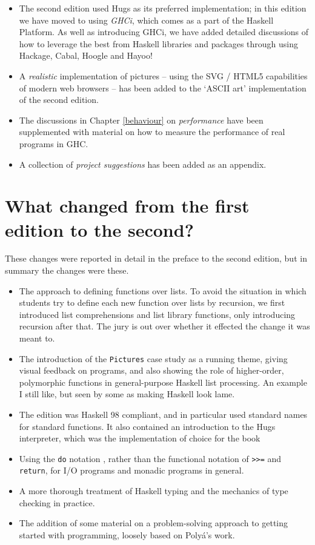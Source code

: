 \begin{itemize}
\item 
The second edition used Hugs as its preferred implementation; in this edition we have moved to using \emph{GHCi}, which comes as a part of the Haskell Platform. As well as introducing GHCi, we have added detailed discussions of how to leverage the best from Haskell libraries and packages through using Hackage, Cabal, Hoogle and Hayoo!

\item
A \emph{realistic} implementation of pictures -- using the SVG / HTML5 capabilities of modern web browsers -- has been added to the `ASCII art' implementation of the second edition. 

\item
The discussions in Chapter \ref{behaviour} on \emph{performance} have been supplemented with material on how to measure the performance of real programs in GHC.

\item
A collection of \emph{project suggestions} has been added as an appendix.
\end{itemize}

\section*{What changed from the first edition to the second?}

These changes were reported in detail in the preface to the second edition, but in summary the changes were these.
\begin{itemize}
\item
The approach to defining functions over lists. To avoid the situation in which students try to define each new function over lists by recursion, we first introduced list comprehensions and list library functions, only introducing recursion after that. The jury is out over whether it effected the change it was meant to.
\item
The introduction of the \texttt{Pictures} case study as a running theme, giving visual feedback on programs, and also showing the role of higher-order, polymorphic functions in general-purpose Haskell list processing. An example I still like, but seen by some as  making Haskell look lame.
\item
The edition was Haskell 98 compliant, and in particular used standard names for standard functions. It also contained an introduction to the Hugs interpreter, which was the implementation of choice for the book
\item
Using the \texttt{do} notation , rather than the functional notation of \texttt{>{}>=} and \texttt{return}, for I/O programs and monadic programs in general.
\item
A more thorough treatment of Haskell typing and the mechanics of type checking in practice.
\item 
The addition of some material on a problem-solving approach to getting started with programming, loosely based on Poly\'{a}'s work.
\end{itemize}


